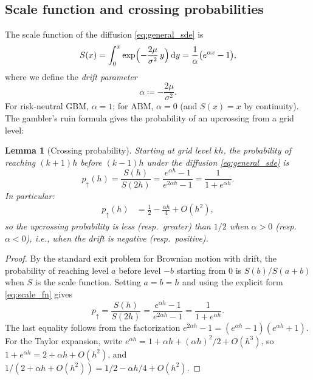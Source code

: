 \documentclass[11pt]{article}
\newtheorem{lemma}[theorem]{Lemma}
\theoremstyle{definition}
\theoremstyle{remark}
\newcommand{\dd}{\,\mathrm{d}}
\begin{document}
\subsection{Scale function and crossing probabilities}\label{sec:scale}

The scale function of the diffusion \eqref{eq:general_sde} is
\begin{equation}\label{eq:scale_fn}
S(x) = \int_0^x \exp\Bigl(-\frac{2\mu}{\sigma^2}\,y\Bigr)\dd y
= \frac{1}{\alpha}\bigl(e^{\alpha x} - 1\bigr),
\end{equation}
where we define the \emph{drift parameter}
\begin{equation}\label{eq:alpha_def}
\alpha \coloneqq -\frac{2\mu}{\sigma^2}.
\end{equation}
For risk-neutral GBM, $\alpha = 1$; for ABM, $\alpha = 0$ (and
$S(x) = x$ by continuity). The gambler's ruin formula gives the
probability of an upcrossing from a grid level:

\begin{lemma}[Crossing probability]\label{lem:p_up}
Starting at grid level $kh$, the probability of reaching
$(k{+}1)h$ before $(k{-}1)h$ under the diffusion
\eqref{eq:general_sde} is
\begin{equation}\label{eq:p_up}
p_\uparrow(h) = \frac{S(h)}{S(2h)}
= \frac{e^{\alpha h} - 1}{e^{2\alpha h} - 1}
= \frac{1}{1 + e^{\alpha h}}.
\end{equation}
In particular:
\begin{align}
p_\uparrow(h) &= \frac{1}{2} - \frac{\alpha h}{4} + O(h^2),
\label{eq:p_up_expand}
\end{align}
so the upcrossing probability is less (resp.\ greater) than $1/2$
when $\alpha > 0$ (resp.\ $\alpha < 0$), i.e., when the drift is
negative (resp.\ positive).
\end{lemma}
\begin{proof}
By the standard exit problem for Brownian motion with drift, the
probability of reaching level $a$ before level $-b$ starting from
$0$ is $S(b)/S(a+b)$ when $S$ is the scale function. Setting
$a = b = h$ and using the explicit form
\eqref{eq:scale_fn} gives
\[
p_\uparrow = \frac{S(h)}{S(2h)}
= \frac{e^{\alpha h} - 1}{e^{2\alpha h} - 1}
= \frac{1}{1 + e^{\alpha h}}.
\]
The last equality follows from the factorization
$e^{2\alpha h} - 1 = (e^{\alpha h} - 1)(e^{\alpha h} + 1)$.
For the Taylor expansion, write $e^{\alpha h} = 1 + \alpha h +
(\alpha h)^2/2 + O(h^3)$, so
$1 + e^{\alpha h} = 2 + \alpha h + O(h^2)$, and
$1/(2 + \alpha h + O(h^2)) = 1/2 - \alpha h/4 + O(h^2)$.
\end{proof}
\end{document}
